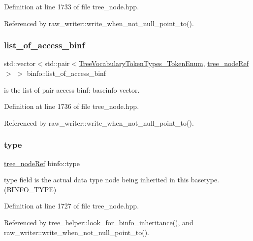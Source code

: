Definition at line 1733 of file tree\+\_\+node.\+hpp.



Referenced by raw\+\_\+writer\+::write\+\_\+when\+\_\+not\+\_\+null\+\_\+point\+\_\+to().

\mbox{\label{structbinfo_aaac07e0ce15a2c864f42a79076d0ee07}} 
\subsubsection{\texorpdfstring{list\+\_\+of\+\_\+access\+\_\+binf}{list\_of\_access\_binf}}
{\footnotesize\ttfamily std\+::vector$<$std\+::pair$<$\hyperlink{token__interface_8hpp_a14502d0757789149f644966ca931b126}{Tree\+Vocabulary\+Token\+Types\+\_\+\+Token\+Enum}, \hyperlink{tree__node_8hpp_a6ee377554d1c4871ad66a337eaa67fd5}{tree\+\_\+node\+Ref}$>$ $>$ binfo\+::list\+\_\+of\+\_\+access\+\_\+binf}



is the list of pair access binf\+: baseinfo vector. 



Definition at line 1736 of file tree\+\_\+node.\+hpp.



Referenced by raw\+\_\+writer\+::write\+\_\+when\+\_\+not\+\_\+null\+\_\+point\+\_\+to().

\mbox{\label{structbinfo_aaf491a3232b888e1810a1d8eb7723e58}} 
\subsubsection{\texorpdfstring{type}{type}}
{\footnotesize\ttfamily \hyperlink{tree__node_8hpp_a6ee377554d1c4871ad66a337eaa67fd5}{tree\+\_\+node\+Ref} binfo\+::type}



type field is the actual data type node being inherited in this basetype.(B\+I\+N\+F\+O\+\_\+\+T\+Y\+PE) 



Definition at line 1727 of file tree\+\_\+node.\+hpp.



Referenced by tree\+\_\+helper\+::look\+\_\+for\+\_\+binfo\+\_\+inheritance(), and raw\+\_\+writer\+::write\+\_\+when\+\_\+not\+\_\+null\+\_\+point\+\_\+to().

